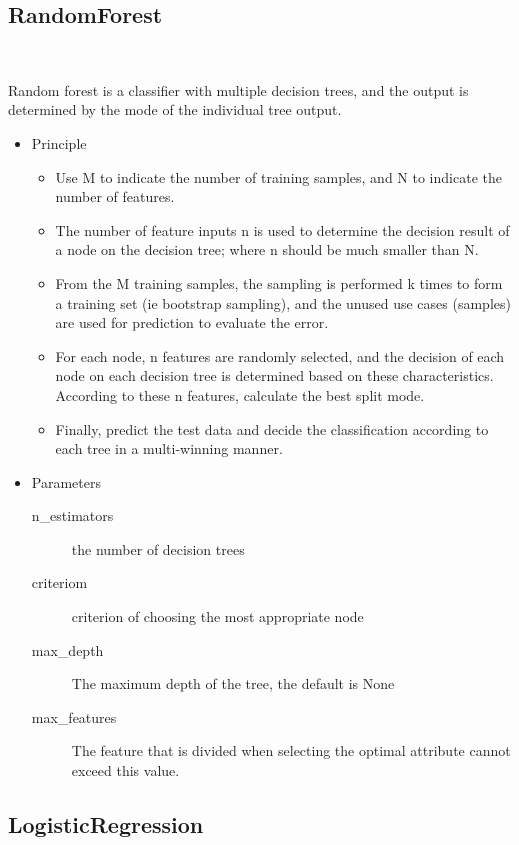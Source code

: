 \subsection{RandomForest}
\

Random forest is a classifier with 
multiple decision trees, and
the output is determined by 
the mode of the individual tree output.

\begin{itemize}
	\item Principle
	
	\begin{itemize}
		\item Use M to indicate the number of training samples, 
		and N to indicate the number of features.
		\item The number of feature inputs n is 
		used to determine the decision result 
		of a node on the decision tree; 
		where n should be much smaller than N.
		\item From the M training samples, 
		the sampling is performed k times to 
		form a training set (ie bootstrap sampling), 
		and the unused use cases (samples) are 
		used for prediction to evaluate the error.
		\item For each node, 
		n features are randomly selected, 
		and the decision of each node on each decision tree is 
		determined based on these characteristics. 
		According to these n features, 
		calculate the best split mode.
		\item Finally, predict the test data and 
		decide the classification 
		according to each tree in a multi-winning manner.
	\end{itemize}
	
	\item Parameters
	
	\begin{description}
		\item[n_estimators] the number of decision trees
		\item[criteriom] criterion of choosing 
		the most appropriate node
		\item[max_depth] The maximum depth of the tree, 
		the default is None 
		\item[max_features] The feature that is divided 
		when selecting the optimal attribute 
		cannot exceed this value.
	\end{description}

\end{itemize}


\subsection{LogisticRegression}
\

